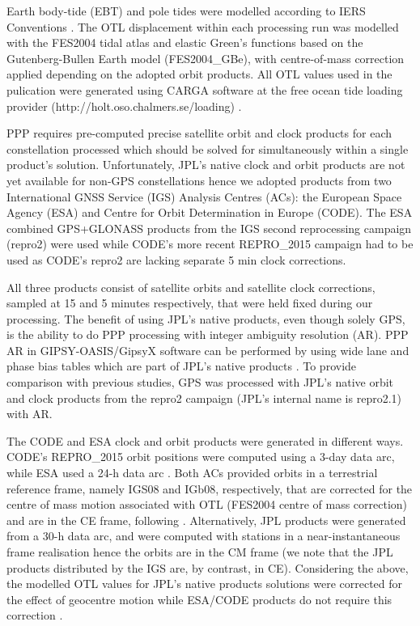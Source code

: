 \documentclass[se, manuscript]{copernicus}
\begin{document}
Earth body-tide (EBT) and pole tides were modelled according to IERS Conventions \citep{IERS2010}. The OTL displacement within each processing run was modelled with the FES2004 tidal atlas \citep{Lyard2006} and elastic Green’s functions based on the Gutenberg-Bullen Earth model \citep{Farrell1972} (FES2004\_GBe), with centre-of-mass correction applied depending on the adopted orbit products. All OTL values used in the pulication were generated using CARGA software at the free ocean tide loading provider (http://holt.oso.chalmers.se/loading) \citep{bos_baker_2005}.

PPP requires pre-computed precise satellite orbit and clock products for each constellation processed which should be solved for simultaneously within a single product's solution. Unfortunately, JPL’s native clock and orbit products are not yet available for non-GPS constellations hence we adopted products from two International GNSS Service (IGS) \citep{Johnston2017} Analysis Centres (ACs): the European Space Agency (ESA) and Centre for Orbit Determination in Europe (CODE). The ESA combined GPS+GLONASS products from the IGS second reprocessing campaign (repro2) were used \citep{Griffiths2019} while CODE’s more recent REPRO\_2015 campaign \citep{repro2015} had to be used as CODE’s repro2 are lacking separate 5 min clock corrections.

All three products consist of satellite orbits and satellite clock corrections, sampled at 15 and 5 minutes respectively, that were held fixed during our processing. The benefit of using JPL’s native products, even though solely GPS, is the ability to do PPP processing with integer ambiguity resolution (AR). PPP AR in GIPSY-OASIS/GipsyX software can be performed by using wide lane and phase bias tables which are part of JPL’s native products \citep{Bertiger2010}. To provide comparison with previous studies, GPS was processed with JPL’s native orbit and clock products from the repro2 campaign (JPL’s internal name is repro2.1) with AR.

The CODE and ESA clock and orbit products were generated in different ways. CODE’s REPRO\_2015 orbit positions were computed using a 3-day data arc, while ESA used a 24-h data arc \citep{Griffiths2019}. Both ACs provided orbits in a terrestrial reference frame, namely IGS08 and IGb08, respectively, that are corrected for the centre of mass motion associated with OTL (FES2004 centre of mass correction) and are in the CE frame, following \cite{Blewitt2003}. Alternatively, JPL products were generated from a 30-h data arc, and were computed with stations in a near-instantaneous frame realisation hence the orbits are in the CM frame (we note that the JPL products distributed by the IGS are, by contrast, in CE). Considering the above, the modelled OTL values for JPL’s native products solutions were corrected for the effect of geocentre motion while ESA/CODE products do not require this correction \citep{Kouba2009}.
\end{document}
